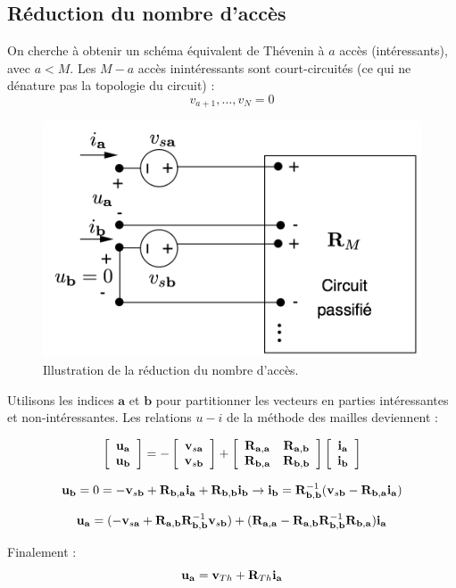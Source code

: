 \subsection{Réduction du nombre d'accès}
On cherche à obtenir un schéma équivalent de Thévenin à $a$ accès (intéressants), avec $a<M$.
Les $M-a$ accès inintéressants sont court-circuités (ce qui ne dénature pas la topologie du circuit) : 
\[v_{a+1},\ldots,v_N=0\]
\begin{figure}[htb]
	\centering
	\includegraphics[width=0.7\linewidth]{figs/methodes-generales/reduction_MM}
	\caption{Illustration de la réduction du nombre d'accès.}
	\label{fig:reduction_MM}
\end{figure}
Utilisons les indices $\mathbf{a}$ et $\mathbf{b}$ pour partitionner les vecteurs en parties intéressantes et non-intéressantes. Les relations $u-i$ de la méthode des mailles deviennent : 
{\small
	\[\left[
	\begin{array}{c}
	{\bf u}_{\bf a}\\
	{\bf u}_{\bf b}
	\end{array}\right]=
	- \left[
	\begin{array}{c}
	{\bf v}_{s{\bf a}}\\
	{\bf v}_{s{\bf b}}
	\end{array}\right] + 
	\left[
	\begin{array}{cc}
	{\bf R}_{\bf a,a}& {\bf R}_{\bf a,b}\\
	{\bf R}_{\bf b,a}& {\bf R}_{\bf b,b}
	\end{array}\right]
	\left[
	\begin{array}{c}
	{\bf i}_{\bf a}\\
	{\bf i}_{\bf b}
	\end{array}\right]\]
	
	\[
	{\bf u}_{\bf b}=0 =-{\bf v}_{s{\bf b}}+{\bf R}_{\bf b,a}{\bf i}_{\bf a}+{\bf
		R}_{\bf b,b}{\bf i}_{\bf b} \rightarrow 
	{\bf i}_{\bf b}={\bf R}_{\bf b,b}^{-1}({\bf v}_{s{\bf b}}-{\bf R}_{\bf
		b,a}{\bf
		i}_{\bf a})\]
	
	\[{\bf u}_{\bf a}=(-{\bf v}_{s{\bf a}}+{\bf R}_{\bf a,b}{\bf R}_{\bf b,b}^{-1}{\bf
		v}_{s{\bf b}})
	+({\bf R}_{\bf a,a}-{\bf R}_{\bf a,b}{\bf R}_{\bf b,b}^{-1}{\bf
		R}_{\bf b,a}){\bf
		i}_{\bf a}\]
	
	Finalement :
	\[ {\bf u}_{\bf a}=
	{\bf v}_{Th}+{\bf R}_{Th}{\bf i}_{\bf a}\]}
